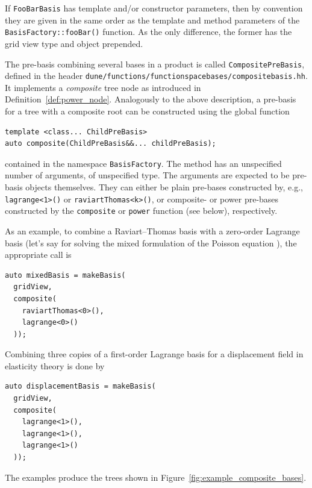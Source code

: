 \documentclass[a4paper,10pt,headings=normal,bibliography=totoc]{scrartcl}
\newcommand{\cpp}[1]{\lstinline[basicstyle=\ttfamily]!#1!}
\newcommand{\file}[1]{\texttt{#1}}
\begin{document}
If \cpp{FooBarBasis} has template and/or constructor parameters, then by convention they
are given in the same order as the template and method
parameters of the \cpp{BasisFactory::fooBar()} function.
As the only difference, the former has the grid view type and object prepended.

The pre-basis combining several bases in a product is called \cpp{CompositePreBasis},
defined in the header \file{dune/functions/functionspacebases/compositebasis.hh}.
It implements a \emph{composite} tree node as introduced in Definition~\ref{def:power_node}.
Analogously to the above description, a pre-basis for a tree with a composite root
can be constructed using the global function
\begin{lstlisting}[style=Interface]
template <class... ChildPreBasis>
auto composite(ChildPreBasis&&... childPreBasis);
\end{lstlisting}
contained in the namespace \cpp{BasisFactory}.
The method has an unspecified number of arguments, of unspecified type.
The arguments are expected to be pre-basis objects themselves.
They can either be plain pre-bases constructed by, e.g.,
\cpp{lagrange<1>()} or \cpp{raviartThomas<k>()},
or composite- or power pre-bases constructed by the \cpp{composite}
or \cpp{power} function (see below), respectively.

As an example, to combine a Raviart--Thomas basis with a zero-order Lagrange basis
(let's say for solving
the mixed formulation of the Poisson equation \cite{braess:2013}), the appropriate call is
\begin{lstlisting}[style=Example]
auto mixedBasis = makeBasis(
  gridView,
  composite(
    raviartThomas<0>(),
    lagrange<0>()
  ));
\end{lstlisting}
Combining three copies of a first-order Lagrange basis for a displacement field in elasticity theory is
done by
\begin{lstlisting}[style=Example]
auto displacementBasis = makeBasis(
  gridView,
  composite(
    lagrange<1>(),
    lagrange<1>(),
    lagrange<1>()
  ));
\end{lstlisting}
The examples produce the trees shown in Figure~\ref{fig:example_composite_bases}.
\end{document}
